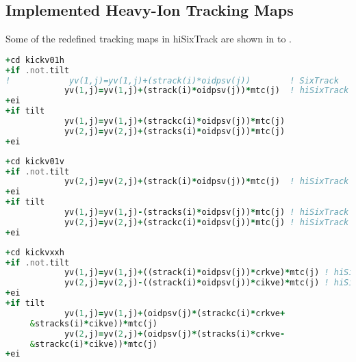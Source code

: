 \begin{appendices}
\subsection{Implemented Heavy-Ion Tracking Maps} \label{chap:implement}

Some of the redefined tracking maps in hiSixTrack are shown in  to . 


\vspace{0.5cm}
\begin{minipage}{\linewidth}
\begin{lstlisting}[language=Fortran,caption=Definition of the transfer map of an horizontal kicker dipole.,label=lst:kickermagnet]
+cd kickv01h
+if .not.tilt
!            yv(1,j)=yv(1,j)+(strack(i)*oidpsv(j))        ! SixTrack
            yv(1,j)=yv(1,j)+(strack(i)*oidpsv(j))*mtc(j)  ! hiSixTrack
+ei
+if tilt
            yv(1,j)=yv(1,j)+(strackc(i)*oidpsv(j))*mtc(j) 
            yv(2,j)=yv(2,j)+(stracks(i)*oidpsv(j))*mtc(j) 
+ei
\end{lstlisting}
\end{minipage}

\vspace{0.5cm}
\begin{minipage}{\linewidth}
\begin{lstlisting}[language=Fortran,caption=Definition of the transfer map of a vertical dipole kick.]
+cd kickv01v
+if .not.tilt
            yv(2,j)=yv(2,j)+(strack(i)*oidpsv(j))*mtc(j)  ! hiSixTrack
+ei
+if tilt
            yv(1,j)=yv(1,j)-(stracks(i)*oidpsv(j))*mtc(j) ! hiSixTrack
            yv(2,j)=yv(2,j)+(strackc(i)*oidpsv(j))*mtc(j) ! hiSixTrack
+ei
\end{lstlisting}
\end{minipage}

\vspace{0.5cm}
\begin{minipage}{\linewidth}
\begin{lstlisting}[language=Fortran,caption=Definition of the transfer map of a quadrupole.,label=lst:quadkick]
+cd kickvxxh
+if .not.tilt
            yv(1,j)=yv(1,j)+((strack(i)*oidpsv(j))*crkve)*mtc(j) ! hiSixTrack
            yv(2,j)=yv(2,j)-((strack(i)*oidpsv(j))*cikve)*mtc(j) ! hiSixTrack
+ei
+if tilt
            yv(1,j)=yv(1,j)+(oidpsv(j)*(strackc(i)*crkve+               &
     &stracks(i)*cikve))*mtc(j)
            yv(2,j)=yv(2,j)+(oidpsv(j)*(stracks(i)*crkve-               &!hr02
     &strackc(i)*cikve))*mtc(j)                                          !hr02
+ei
\end{lstlisting}
\end{minipage}




\end{appendices}
